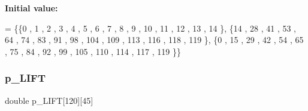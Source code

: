 {\bfseries Initial value\+:}
\begin{DoxyCode}
= \{\{0 , 1 , 2 , 3 , 4 , 5 , 6 , 7 , 8 , 9 , 10 , 11 , 12 , 13 , 14 \},
\{14 , 28 , 41 , 53 , 64 , 74 , 83 , 91 , 98 , 104 , 109 , 113 , 116 , 118 , 119 \},
\{0 , 15 , 29 , 42 , 54 , 65 , 75 , 84 , 92 , 99 , 105 , 110 , 114 , 117 , 119 \}\}
\end{DoxyCode}
\mbox{\label{a00545_adeca9a4dc0ce863a154f6f0ab2c1d510}} 
\subsubsection{\texorpdfstring{p\+\_\+\+L\+I\+FT}{p\_LIFT}}
{\footnotesize\ttfamily double p\+\_\+\+L\+I\+FT\mbox{[}120\mbox{]}\mbox{[}45\mbox{]}}

\mbox{\label{a00545_a93664994bfca0598d5acb1878413f1c7}} 
